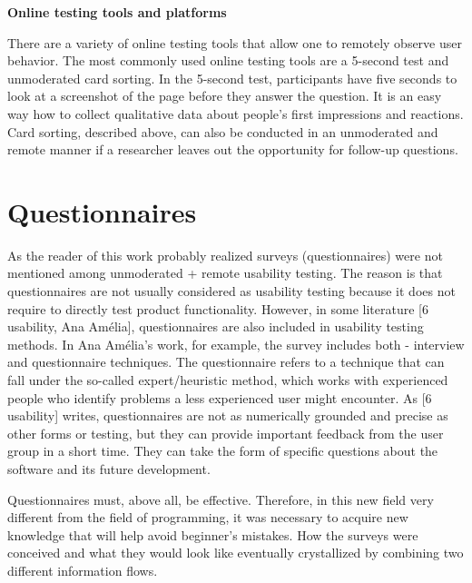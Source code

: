 \documentclass[a4paper,10pt,twoside]{article}
\begin{document}
\noindent \textbf {Online testing tools and platforms}

\noindent There are a variety of online testing tools that allow one to remotely observe user behavior. The most commonly used online testing tools are a 5-second test and unmoderated card sorting. In the 5-second test, participants have five seconds to look at a screenshot of the page before they answer the question. It is an easy way how to collect qualitative data about people’s first impressions and reactions. Card sorting, described above, can also be conducted in an unmoderated and remote manner if a researcher leaves out the opportunity for follow-up questions.


\newpage
\vspace*{-1cm}
\section{Questionnaires}
\label{sec:questionnaires}

\noindent As the reader of this work probably realized surveys (questionnaires) were not mentioned among unmoderated + remote usability testing. The reason is that questionnaires are not usually considered as usability testing because it does not require to directly test product functionality. However, in some literature [6 usability, Ana Amélia], questionnaires are also included in usability testing methods. In Ana Amélia's work, for example, the survey includes both - interview and questionnaire techniques. The questionnaire refers to a technique that can fall under the so-called expert/heuristic method, which works with experienced people who identify problems a less experienced user might encounter. As [6 usability] writes, questionnaires are not as numerically grounded and precise as other forms or testing, but they can provide important feedback from the user group in a short time. They can take the form of specific questions about the software and its future development.

Questionnaires must, above all, be effective. Therefore, in this new field very different from the field of programming, it was necessary to acquire new knowledge that will help avoid beginner's mistakes. How the surveys were conceived and what they would look like eventually crystallized by combining two different information flows.
\end{document}
